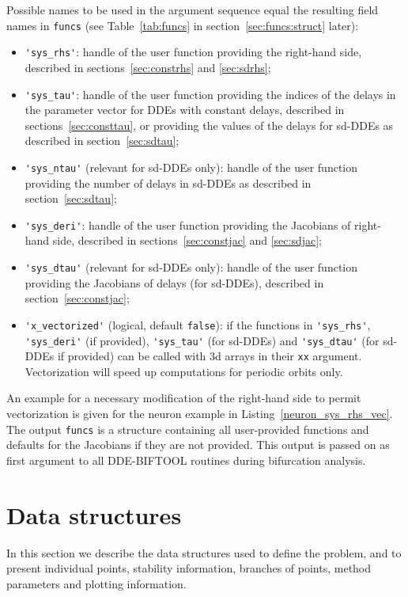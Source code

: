 \documentclass[10pt]{scrartcl}
\newcommand{\DDEBIFCODE}{\textsc{DDE-BIFTOOL}}
\newcommand{\blist}[1]{\mbox{\lstinline!#1!}}
\begin{document}
Possible names to be used in the argument sequence
equal the resulting field names in \blist{funcs} (see
Table~\ref{tab:funcs} in section~\ref{sec:funcs:struct} later):
\begin{itemize}
\item \blist{'sys_rhs'}: handle of the user function providing the
  right-hand side, described in sections~\ref{sec:constrhs} and
  \ref{sec:sdrhs};
\item \blist{'sys_tau'}: handle of the user function providing the
  indices of the delays in the parameter vector for DDEs with constant
  delays, described in sections~\ref{sec:consttau}, or providing the
  values of the delays for sd-DDEs as described in
  section~\ref{sec:sdtau};
\item \blist{'sys_ntau'} (relevant for sd-DDEs only): handle of the
  user function providing the number of delays in sd-DDEs as described
  in section~\ref{sec:sdtau};
\item \blist{'sys_deri'}: handle of the user function providing the
  Jacobians of right-hand side, described in
  sections~\ref{sec:constjac} and \ref{sec:sdjac};
\item \blist{'sys_dtau'} (relevant for sd-DDEs only): handle of the user
  function providing the Jacobians of delays (for sd-DDEs), described
  in section~\ref{sec:constjac};
\item \blist{'x_vectorized'} (logical, default \blist{false}): if the
  functions in \blist{'sys_rhs'}, \blist{'sys_deri'} (if provided),
  \blist{'sys_tau'} (for sd-DDEs) and \blist{'sys_dtau'} (for sd-DDEs
  if provided) can be called with $3$d arrays in their \blist{xx}
  argument. Vectorization will speed up computations for periodic
  orbits only.
\end{itemize}
An example for a necessary modification of the right-hand side to
permit vectorization is given for the neuron example in
Listing~\ref{neuron_sys_rhs_vec}. The output \blist{funcs} is a
structure containing all user-provided functions and defaults for the
Jacobians if they are not provided. This output is passed on as first
argument to all \DDEBIFCODE{} routines during bifurcation analysis.

\section{Data structures}\label{data_structures}

In this section we describe the data structures used to define the
problem, and to present individual points, stability information, branches
of points, method parameters and plotting information.
\end{document}
